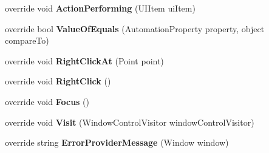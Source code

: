 \begin{DoxyCompactItemize}
\item 
\hypertarget{class_proto_test_1_1_golem_1_1_white_1_1_elements_1_1_white_list_view_a9b6d49a35b5769a52d12cd78ed1e81c6}{override void {\bfseries Action\-Performing} (U\-I\-Item ui\-Item)}\label{class_proto_test_1_1_golem_1_1_white_1_1_elements_1_1_white_list_view_a9b6d49a35b5769a52d12cd78ed1e81c6}

\item 
\hypertarget{class_proto_test_1_1_golem_1_1_white_1_1_elements_1_1_white_list_view_ae12765c9416a2e1860d8cd06c22dfd14}{override bool {\bfseries Value\-Of\-Equals} (Automation\-Property property, object compare\-To)}\label{class_proto_test_1_1_golem_1_1_white_1_1_elements_1_1_white_list_view_ae12765c9416a2e1860d8cd06c22dfd14}

\item 
\hypertarget{class_proto_test_1_1_golem_1_1_white_1_1_elements_1_1_white_list_view_a83a33f642d637e468ced1e01f38785d7}{override void {\bfseries Right\-Click\-At} (Point point)}\label{class_proto_test_1_1_golem_1_1_white_1_1_elements_1_1_white_list_view_a83a33f642d637e468ced1e01f38785d7}

\item 
\hypertarget{class_proto_test_1_1_golem_1_1_white_1_1_elements_1_1_white_list_view_aba3ccd5488e26eda48711fe339505786}{override void {\bfseries Right\-Click} ()}\label{class_proto_test_1_1_golem_1_1_white_1_1_elements_1_1_white_list_view_aba3ccd5488e26eda48711fe339505786}

\item 
\hypertarget{class_proto_test_1_1_golem_1_1_white_1_1_elements_1_1_white_list_view_a54d9354a9c91020305dadc37dfdee587}{override void {\bfseries Focus} ()}\label{class_proto_test_1_1_golem_1_1_white_1_1_elements_1_1_white_list_view_a54d9354a9c91020305dadc37dfdee587}

\item 
\hypertarget{class_proto_test_1_1_golem_1_1_white_1_1_elements_1_1_white_list_view_ab427af3e681f515e92eb55d03050a032}{override void {\bfseries Visit} (Window\-Control\-Visitor window\-Control\-Visitor)}\label{class_proto_test_1_1_golem_1_1_white_1_1_elements_1_1_white_list_view_ab427af3e681f515e92eb55d03050a032}

\item 
\hypertarget{class_proto_test_1_1_golem_1_1_white_1_1_elements_1_1_white_list_view_a05b33cf4d9bf26b54bee86e6cf2d3a0f}{override string {\bfseries Error\-Provider\-Message} (Window window)}\label{class_proto_test_1_1_golem_1_1_white_1_1_elements_1_1_white_list_view_a05b33cf4d9bf26b54bee86e6cf2d3a0f}


\end{DoxyCompactItemize}
